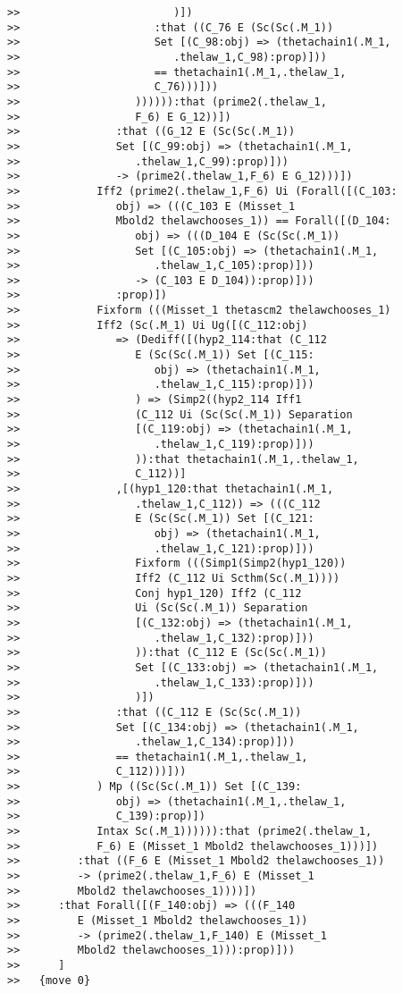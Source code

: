 \documentclass[12pt]{article}
\begin{document}
\begin{verbatim}
>>                        )])
>>                     :that ((C_76 E (Sc(Sc(.M_1))
>>                     Set [(C_98:obj) => (thetachain1(.M_1,
>>                        .thelaw_1,C_98):prop)]))
>>                     == thetachain1(.M_1,.thelaw_1,
>>                     C_76)))]))
>>                  )))))):that (prime2(.thelaw_1,
>>                  F_6) E G_12))])
>>               :that ((G_12 E (Sc(Sc(.M_1))
>>               Set [(C_99:obj) => (thetachain1(.M_1,
>>                  .thelaw_1,C_99):prop)]))
>>               -> (prime2(.thelaw_1,F_6) E G_12)))])
>>            Iff2 (prime2(.thelaw_1,F_6) Ui (Forall([(C_103:
>>               obj) => (((C_103 E (Misset_1
>>               Mbold2 thelawchooses_1)) == Forall([(D_104:
>>                  obj) => (((D_104 E (Sc(Sc(.M_1))
>>                  Set [(C_105:obj) => (thetachain1(.M_1,
>>                     .thelaw_1,C_105):prop)]))
>>                  -> (C_103 E D_104)):prop)]))
>>               :prop)])
>>            Fixform (((Misset_1 thetascm2 thelawchooses_1)
>>            Iff2 (Sc(.M_1) Ui Ug([(C_112:obj)
>>               => (Dediff([(hyp2_114:that (C_112
>>                  E (Sc(Sc(.M_1)) Set [(C_115:
>>                     obj) => (thetachain1(.M_1,
>>                     .thelaw_1,C_115):prop)]))
>>                  ) => (Simp2((hyp2_114 Iff1
>>                  (C_112 Ui (Sc(Sc(.M_1)) Separation
>>                  [(C_119:obj) => (thetachain1(.M_1,
>>                     .thelaw_1,C_119):prop)]))
>>                  )):that thetachain1(.M_1,.thelaw_1,
>>                  C_112))]
>>               ,[(hyp1_120:that thetachain1(.M_1,
>>                  .thelaw_1,C_112)) => (((C_112
>>                  E (Sc(Sc(.M_1)) Set [(C_121:
>>                     obj) => (thetachain1(.M_1,
>>                     .thelaw_1,C_121):prop)]))
>>                  Fixform (((Simp1(Simp2(hyp1_120))
>>                  Iff2 (C_112 Ui Scthm(Sc(.M_1))))
>>                  Conj hyp1_120) Iff2 (C_112
>>                  Ui (Sc(Sc(.M_1)) Separation
>>                  [(C_132:obj) => (thetachain1(.M_1,
>>                     .thelaw_1,C_132):prop)]))
>>                  )):that (C_112 E (Sc(Sc(.M_1))
>>                  Set [(C_133:obj) => (thetachain1(.M_1,
>>                     .thelaw_1,C_133):prop)]))
>>                  )])
>>               :that ((C_112 E (Sc(Sc(.M_1))
>>               Set [(C_134:obj) => (thetachain1(.M_1,
>>                  .thelaw_1,C_134):prop)]))
>>               == thetachain1(.M_1,.thelaw_1,
>>               C_112)))]))
>>            ) Mp ((Sc(Sc(.M_1)) Set [(C_139:
>>               obj) => (thetachain1(.M_1,.thelaw_1,
>>               C_139):prop)])
>>            Intax Sc(.M_1)))))):that (prime2(.thelaw_1,
>>            F_6) E (Misset_1 Mbold2 thelawchooses_1)))])
>>         :that ((F_6 E (Misset_1 Mbold2 thelawchooses_1))
>>         -> (prime2(.thelaw_1,F_6) E (Misset_1
>>         Mbold2 thelawchooses_1))))])
>>      :that Forall([(F_140:obj) => (((F_140
>>         E (Misset_1 Mbold2 thelawchooses_1))
>>         -> (prime2(.thelaw_1,F_140) E (Misset_1
>>         Mbold2 thelawchooses_1))):prop)]))
>>      ]
>>   {move 0}




\end{verbatim}
\end{document}
